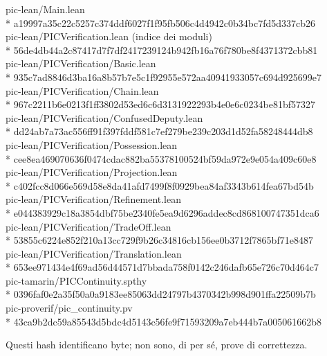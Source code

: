 \documentclass[10pt,oneside,openany]{book}
\begin{document}
{\scriptsize\ttfamily\raggedright
pic-lean/Main.lean\\*
\hspace*{1.2em}a19997a35c22c5257c374ddf6027f1f95fb506c4d4942c0b34bc7fd5d337cb26\\
pic-lean/PICVerification.lean (indice dei moduli)\\*
\hspace*{1.2em}56de4db44a2c87417d7f7df2417239124b942fb16a76f780be8f4371372cbb81\\
pic-lean/PICVerification/Basic.lean\\*
\hspace*{1.2em}935c7ad8846d3ba16a8b57b7e5c1f92955e572aa40941933057c694d925699e7\\
pic-lean/PICVerification/Chain.lean\\*
\hspace*{1.2em}967c2211b6e0213f1ff3802d53ed6c6d3131922293b4e0e6c0234be81bf57327\\
pic-lean/PICVerification/ConfusedDeputy.lean\\*
\hspace*{1.2em}dd24ab7a73ac556ff91f397fddf581c7ef279be239c203d1d52fa58248444db8\\
pic-lean/PICVerification/Possession.lean\\*
\hspace*{1.2em}cee8ea469070636f0474cdac882ba55378100524bf59da972e9e054a409c60e8\\
pic-lean/PICVerification/Projection.lean\\*
\hspace*{1.2em}c402fcc8d066e569d58e8da41afd7499f8f0929bea84af3343b614fea67bd54b\\
pic-lean/PICVerification/Refinement.lean\\*
\hspace*{1.2em}e044383929c18a3854dbf75be2340fe5ea9d6296addec8cd868100747351dca6\\
pic-lean/PICVerification/TradeOff.lean\\*
\hspace*{1.2em}53855c6224e852f210a13cc729f9b26c34816cb156ee0b3712f7865bf71e8487\\
pic-lean/PICVerification/Translation.lean\\*
\hspace*{1.2em}653ee971434e4f69ad56d44571d7bbada758f0142c246dafb65e726c70d464c7\\
pic-tamarin/PICContinuity.spthy\\*
\hspace*{1.2em}0396faf0e2a35f50a0a9183ee85063dd24797b4370342b998d901ffa22509b7b\\
pic-proverif/pic\_continuity.pv\\*
\hspace*{1.2em}43ca9b2dc59a85543d5bdc4d5143c56fe9f71593209a7eb444b7a005061662b8\par}
Questi hash identificano byte; non sono, di per sé, prove di correttezza.
\end{document}
